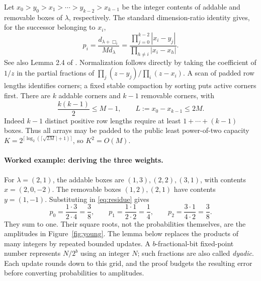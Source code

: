 \documentclass[11pt]{article}
\theoremstyle{definition}
\begin{document}
Let $x_0>y_0>x_1>\cdots>y_{k-2}>x_{k-1}$ be the integer contents of
addable and removable boxes of $\lambda$, respectively. The standard
dimension-ratio identity gives, for the successor belonging to $x_i$,
\begin{equation}\label{eq:residue}
 p_i=\frac{d_{\lambda+\Box_i}}{M d_\lambda}
 =\frac{\prod_{j=0}^{k-2}|x_i-y_j|}{\prod_{h\ne i}|x_i-x_h|}.
\end{equation}
See also Lemma 2.4 of \cite{bgo}. Normalization follows directly by taking
the coefficient of $1/z$ in the partial fractions of
$\prod_j(z-y_j)/\prod_i(z-x_i)$. A scan of padded row lengths identifies
corners; a fixed stable compaction by sorting puts active corners first.
There are $k$ addable corners and $k-1$ removable corners, with
\[
 \frac{k(k-1)}2\le M-1,\qquad L:=x_0-x_{k-1}\le2M.
\]
Indeed $k-1$ distinct positive row lengths require at least
$1+\cdots+(k-1)$ boxes. Thus all arrays may be padded to the public
least power-of-two capacity
$K=2^{\lceil\log_2(\lceil\sqrt{2M}\rceil+1)\rceil}$, so $K^2=O(M)$.

\paragraph{Worked example: deriving the three weights.}
For $\lambda=(2,1)$, the addable boxes are $(1,3),(2,2),(3,1)$,
with contents $x=(2,0,-2)$. The removable boxes $(1,2),(2,1)$ have
contents $y=(1,-1)$. Substituting in \eqref{eq:residue} gives
\[
 p_0=\frac{1\cdot3}{2\cdot4}=\frac38,\qquad
 p_1=\frac{1\cdot1}{2\cdot2}=\frac14,\qquad
 p_2=\frac{3\cdot1}{4\cdot2}=\frac38.
\]
They sum to one. Their square roots, not the probabilities themselves,
are the amplitudes in Figure~\ref{fig:young}.
The lemma below replaces the products of many integers by repeated
bounded updates. A $b$-fractional-bit fixed-point number represents
$N/2^b$ using an integer $N$; such fractions are also called \emph{dyadic}.
Each update rounds down to this grid, and the proof budgets the resulting
error before converting probabilities to amplitudes.
\end{document}
